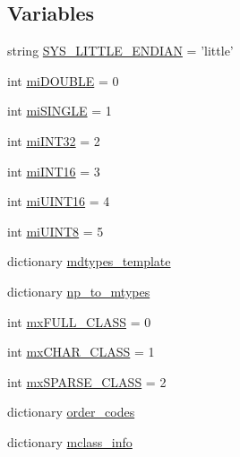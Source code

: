\subsection*{Variables}
\begin{DoxyCompactItemize}
\item 
string \hyperlink{namespacescipy_1_1io_1_1matlab_1_1mio4_a5dbd8a10a7ff7916403613f047eee4ba}{S\+Y\+S\+\_\+\+L\+I\+T\+T\+L\+E\+\_\+\+E\+N\+D\+I\+A\+N} = 'little'
\item 
int \hyperlink{namespacescipy_1_1io_1_1matlab_1_1mio4_ae07035c6e0171210c874f1d1476d8e97}{mi\+D\+O\+U\+B\+L\+E} = 0
\item 
int \hyperlink{namespacescipy_1_1io_1_1matlab_1_1mio4_acdbc387d8f1f21cdc8beb2b5486045cf}{mi\+S\+I\+N\+G\+L\+E} = 1
\item 
int \hyperlink{namespacescipy_1_1io_1_1matlab_1_1mio4_a615c5f4e65c3a9be908e72c4e7505d39}{mi\+I\+N\+T32} = 2
\item 
int \hyperlink{namespacescipy_1_1io_1_1matlab_1_1mio4_ab7a94b25780f2e74d95b4f7a6435b06c}{mi\+I\+N\+T16} = 3
\item 
int \hyperlink{namespacescipy_1_1io_1_1matlab_1_1mio4_a05c3641bcfdc4af8d07e7ebccb1729f1}{mi\+U\+I\+N\+T16} = 4
\item 
int \hyperlink{namespacescipy_1_1io_1_1matlab_1_1mio4_a09cb15e7e584c7e67072784c12f11d5f}{mi\+U\+I\+N\+T8} = 5
\item 
dictionary \hyperlink{namespacescipy_1_1io_1_1matlab_1_1mio4_aca711630f56fcd5da1403d40d703e157}{mdtypes\+\_\+template}
\item 
dictionary \hyperlink{namespacescipy_1_1io_1_1matlab_1_1mio4_a8559578f5631890f26254654cc7dd485}{np\+\_\+to\+\_\+mtypes}
\item 
int \hyperlink{namespacescipy_1_1io_1_1matlab_1_1mio4_ad4760c4af051b90fe6767fe09ee6e4dc}{mx\+F\+U\+L\+L\+\_\+\+C\+L\+A\+S\+S} = 0
\item 
int \hyperlink{namespacescipy_1_1io_1_1matlab_1_1mio4_a715f5ce00baf756b404e3e4d8cdba3bb}{mx\+C\+H\+A\+R\+\_\+\+C\+L\+A\+S\+S} = 1
\item 
int \hyperlink{namespacescipy_1_1io_1_1matlab_1_1mio4_a9c65d032a83a50d6a9f88b7c3f6bb9fe}{mx\+S\+P\+A\+R\+S\+E\+\_\+\+C\+L\+A\+S\+S} = 2
\item 
dictionary \hyperlink{namespacescipy_1_1io_1_1matlab_1_1mio4_a591fa20b2c56435d48f6fcfe88d3d2e9}{order\+\_\+codes}
\item 
dictionary \hyperlink{namespacescipy_1_1io_1_1matlab_1_1mio4_abe01bc326de3c5d052c18aa902ee1961}{mclass\+\_\+info}
\end{DoxyCompactItemize}


